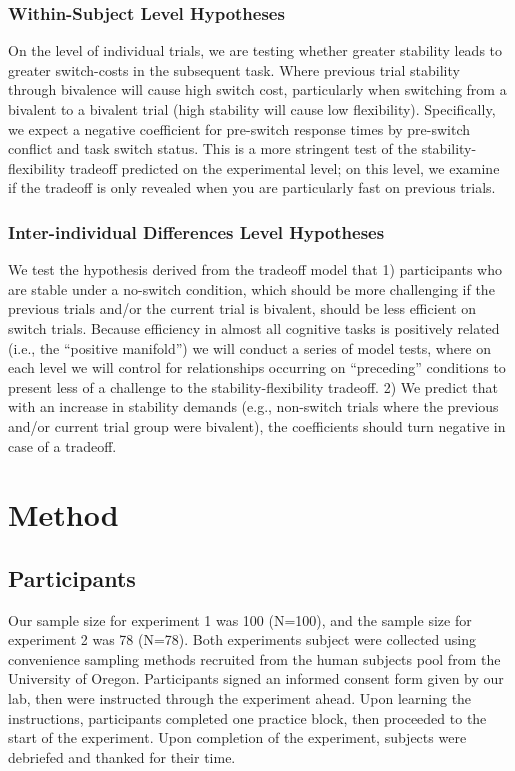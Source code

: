 \documentclass[
  english,
  man,floatsintext]{apa6}
\begin{document}
\subsubsection{Within-Subject Level Hypotheses}\label{within-subject-level-hypotheses}

On the level of individual trials, we are testing whether greater stability leads to greater switch-costs in the subsequent task. Where previous trial stability through bivalence will cause high switch cost, particularly when switching from a bivalent to a bivalent trial (high stability will cause low flexibility). Specifically, we expect a negative coefficient for pre-switch response times by pre-switch conflict and task switch status. This is a more stringent test of the stability-flexibility tradeoff predicted on the experimental level; on this level, we examine if the tradeoff is only revealed when you are particularly fast on previous trials.

\subsubsection{Inter-individual Differences Level Hypotheses}\label{inter-individual-differences-level-hypotheses}

We test the hypothesis derived from the tradeoff model that 1) participants who are stable under a no-switch condition, which should be more challenging if the previous trials and/or the current trial is bivalent, should be less efficient on switch trials. Because efficiency in almost all cognitive tasks is positively related (i.e., the ``positive manifold'') we will conduct a series of model tests, where on each level we will control for relationships occurring on ``preceding'' conditions to present less of a challenge to the stability-flexibility tradeoff. 2) We predict that with an increase in stability demands (e.g., non-switch trials where the previous and/or current trial group were bivalent), the coefficients should turn negative in case of a tradeoff.

\section{Method}\label{method}

\subsection{Participants}\label{participants}

Our sample size for experiment 1 was 100 (N=100), and the sample size for experiment 2 was 78 (N=78). Both experiments subject were collected using convenience sampling methods recruited from the human subjects pool from the University of Oregon. Participants signed an informed consent form given by our lab, then were instructed through the experiment ahead. Upon learning the instructions, participants completed one practice block, then proceeded to the start of the experiment. Upon completion of the experiment, subjects were debriefed and thanked for their time.
\end{document}
